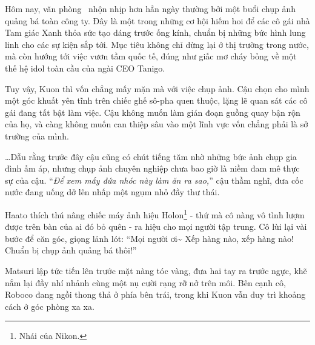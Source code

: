 \documentclass[../main.tex]{subfiles}
\begin{document}
\color{black}


Hôm nay, văn phòng \hll\ nhộn nhịp hơn hẳn ngày thường bởi một buổi chụp ảnh quảng bá toàn công ty. Đây là một trong những cơ hội hiếm hoi để các cô gái nhà Tam giác Xanh thỏa sức tạo dáng trước ống kính, chuẩn bị những bức hình lung linh cho các sự kiện sắp tới. Mục tiêu không chỉ dừng lại ở thị trường trong nước, mà còn hướng tới việc vươn tầm quốc tế, đúng như giấc mơ cháy bỏng về một thế hệ idol toàn cầu của ngài CEO Tanigo.

Tuy vậy, Kuon thì vốn chẳng mấy mặn mà với việc chụp ảnh. Cậu chọn cho mình một góc khuất yên tĩnh trên chiếc ghế sô-pha quen thuộc, lặng lẽ quan sát các cô gái đang tất bật làm việc. Cậu không muốn làm gián đoạn guồng quay bận rộn của họ, và càng không muốn can thiệp sâu vào một lĩnh vực vốn chẳng phải là sở trường của mình.

\dots Dẫu rằng trước đây cậu cũng có chút tiếng tăm nhờ những bức ảnh chụp gia đình ấm áp, nhưng chụp ảnh chuyên nghiệp chưa bao giờ là niềm đam mê thực sự của cậu. ``\textit{Để xem mấy đứa nhóc này làm ăn ra sao,}'' cậu thầm nghĩ, đưa cốc nước đang uống dở lên nhấp một ngụm nhỏ đầy thư thái.


Haato thích thú nâng chiếc máy ảnh hiệu Holon\footnote{Nhái của Nikon.} - thứ mà cô nàng vô tình lượm được trên bàn của ai đó bỏ quên - ra hiệu cho mọi người tập trung. Cô lùi lại vài bước để căn góc, giọng lảnh lót: ``Mọi người ơi\~{} Xếp hàng nào, xếp hàng nào! Chuẩn bị chụp ảnh quảng bá thôi!''

Matsuri lập tức tiến lên trước mặt nàng tóc vàng, đưa hai tay ra trước ngực, khẽ nắm lại đầy nhí nhảnh cùng một nụ cười rạng rỡ nở trên môi. Bên cạnh cô, Roboco đang ngồi thong thả ở phía bên trái, trong khi Kuon vẫn duy trì khoảng cách ở góc phòng xa xa.
\end{document}
